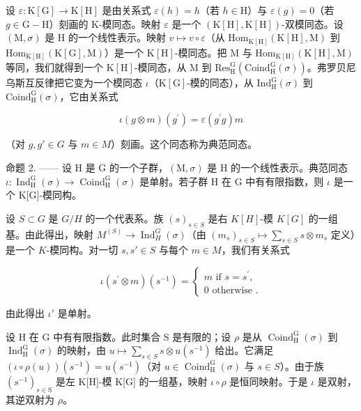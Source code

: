 设 \(\varepsilon : \mathrm{K}[\mathrm{G}] \to \mathrm{K}[\mathrm{H}]\) 是由关系式 \(\varepsilon(h) = h\)（若 \(h \in \mathrm{H}\)）与 \(\varepsilon(g) = 0\)（若 \(g \in \mathrm{G} - \mathrm{H}\)）刻画的 K-模同态。映射 \(\varepsilon\) 是一个 \((\mathrm{K}[\mathrm{H}], \mathrm{K}[\mathrm{H}])\)-双模同态。设 \((\mathrm{M}, \sigma)\) 是 H 的一个线性表示。映射 \(v \mapsto v \circ \varepsilon\)（从 \(\mathrm{Hom}_{\mathrm{K}[\mathrm{H}]}(\mathrm{K}[\mathrm{H}], \mathrm{M})\) 到 \(\mathrm{Hom}_{\mathrm{K}[\mathrm{H}]}(\mathrm{K}[\mathrm{G}], \mathrm{M})\)）是一个 \(\mathrm{K}[\mathrm{H}]\)-模同态。把 M 与 \(\mathrm{Hom}_{\mathrm{K}[\mathrm{H}]}(\mathrm{K}[\mathrm{H}], \mathrm{M})\) 等同，我们就得到一个 \(\mathrm{K}[\mathrm{H}]\)-模同态，从 M 到 \(\mathrm{Res}_{\mathrm{H}}^{\mathrm{G}}(\mathrm{Coind}_{\mathrm{H}}^{\mathrm{G}}(\sigma))\)。弗罗贝尼乌斯互反律把它变为一个模同态 \(\iota\)（\(\mathrm{K}[\mathrm{G}]\)-模的同态），从 \(\mathrm{Ind}_{\mathrm{H}}^{\mathrm{G}}(\sigma)\) 到 \(\mathrm{Coind}_{\mathrm{H}}^{\mathrm{G}}(\sigma)\)，它由关系式

\[
\iota (g \otimes m) (g ^ {\prime}) = \varepsilon (g ^ {\prime} g) m
\]

（对 \(g, g' \in G\) 与 \(m \in M\)）刻画。这个同态称为典范同态。

命题 2. —— 设 H 是 G 的一个子群，\((\mathrm{M},\sigma)\) 是 H 的一个线性表示。典范同态 \(\iota:\operatorname{Ind}_{\mathrm{H}}^{\mathrm{G}}(\sigma)\to\operatorname{Coind}_{\mathrm{H}}^{\mathrm{G}}(\sigma)\) 是单射。若子群 H 在 G 中有有限指数，则 \(\iota\) 是一个 K{[}G{]}-模同构。

设 \(S \subset G\) 是 \(G/H\) 的一个代表系。族 \((s)_{s \in S}\) 是右 \(K[H]\)-模 \(K[G]\) 的一组基。由此得出，映射 \(M^{(S)} \to \operatorname{Ind}_{H}^{G}(\sigma)\)（由 \((m_s)_{s \in S} \mapsto \sum_{s \in S} s \otimes m_s\) 定义）是一个 \(K\)-模同构。对一切 \(s, s' \in S\) 与每个 \(m \in M\)，我们有关系式

\[
\iota (s ^ {\prime} \otimes m) (s ^ {- 1}) = \left\{ \begin{array}{l} m \text {   if   } s = s ^ {\prime}, \\ 0 \text {   otherwise }. \end{array} \right.
\]

由此得出 \(\iota'\) 是单射。

设 H 在 G 中有有限指数。此时集合 S 是有限的；设 \(\rho\) 是从 \(\operatorname{Coind}_{\mathrm{H}}^{\mathrm{G}}(\sigma)\) 到 \(\operatorname{Ind}_{\mathrm{H}}^{\mathrm{G}}(\sigma)\) 的映射，由 \(u \mapsto \sum_{s \in S} s \otimes u(s^{-1})\) 给出。它满足 \((\iota \circ \rho(u))(s^{-1}) = u(s^{-1})\)（对 \(u \in \operatorname{Coind}_{\mathrm{H}}^{\mathrm{G}}(\sigma)\) 与 \(s \in S\)）。由于族 \((s^{-1})_{s\in\mathrm{S}}\) 是左 K{[}H{]}-模 K{[}G{]} 的一组基，映射 \(\iota\circ\rho\) 是恒同映射。于是 \(\iota\) 是双射，其逆双射为 \(\rho\)。

